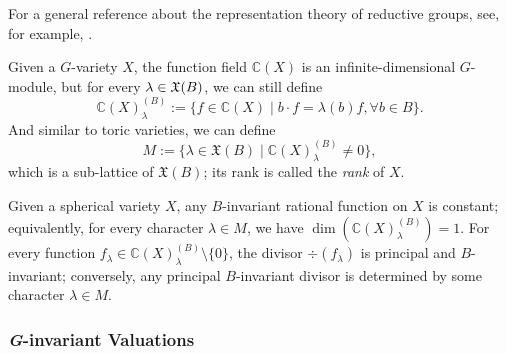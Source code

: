 For a general reference about the representation theory of reductive groups, see, for example, \cite{MT_Lin_alg_grp_fin_grp_Lie}. 

Given a $G$-variety $X$, the function field $\mathbb{C}(X)$ is an infinite-dimensional $G$-module, but for every $\lambda \in \mathfrak{X}(B)$, we can still define 
\begin{equation*}
	\mathbb{C}(X)_\lambda^{(B)} := \{f \in \mathbb{C}(X) \mid b \cdot f = \lambda(b) f, \forall b \in B\}.
\end{equation*}
And similar to toric varieties, we can define 
\begin{equation*}
	M := \{\lambda \in \mathfrak{X}(B) \mid \mathbb{C}(X)_\lambda^{(B)} \neq 0 \},
\end{equation*}
which is a sub-lattice of $\mathfrak{X}(B)$; its rank is called the \emph{rank} of $X$.

Given a spherical variety $X$, any $B$-invariant rational function on $X$ is constant; equivalently, for every character $\lambda \in M$, we have $\dim(\mathbb{C}(X)_\lambda^{(B)}) = 1$. For every function $f_\lambda \in \mathbb{C}(X)_\lambda^{(B)} \setminus \{0\}$, the divisor $\div(f_\lambda)$ is principal and $B$-invariant; conversely, any principal $B$-invariant divisor is determined by some character $\lambda \in M$.

\subsubsection{\textit{G}-invariant Valuations}\label{sec:prelim:sph:val}

